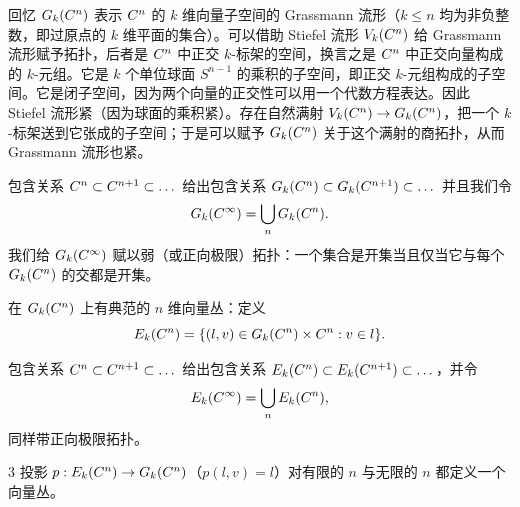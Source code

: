 回忆 $G_k(C^n)$ 表示 $C^n$ 的 $k$ 维向量子空间的 Grassmann 流形（$k\le n$ 均为非负整数，即过原点的 $k$ 维平面的集合）。可以借助 Stiefel 流形 $V_k(C^n)$ 给 Grassmann 流形赋予拓扑，后者是 $C^n$ 中正交 $k$-标架的空间，换言之是 $C^n$ 中正交向量构成的 $k$-元组。它是 $k$ 个单位球面 $S^{n-1}$ 的乘积的子空间，即正交 $k$-元组构成的子空间。它是闭子空间，因为两个向量的正交性可以用一个代数方程表达。因此 Stiefel 流形紧（因为球面的乘积紧）。存在自然满射 $V_k(C^n)\to G_k(C^n)$，把一个 $k$-标架送到它张成的子空间；于是可以赋予 $G_k(C^n)$ 关于这个满射的商拓扑，从而 Grassmann 流形也紧。


包含关系 $C^n\subset C^{n+1}\subset\dots$ 给出包含关系 $G_k(C^n)\subset G_k(C^{n+1})\subset\dots$
并且我们令
\[ G_k(C^\infty)=\bigcup_n G_k(C^n). \]
我们给 $G_k(C^\infty)$ 赋以弱（或正向极限）拓扑：一个集合是开集当且仅当它与每个 $G_k(C^n)$ 的交都是开集。

在 $G_k(C^n)$ 上有典范的 $n$ 维向量丛：定义
\[ E_k(C^n)=\{(l,v)\in G_k(C^n)\times C^n : v\in l\}. \]


包含关系 $C^n\subset C^{n+1}\subset\dots$ 给出包含关系 $E_k(C^n)\subset E_k(C^{n+1})\subset\dots$，并令
\[ E_k(C^\infty)=\bigcup_n E_k(C^n), \]
同样带正向极限拓扑。

\begin{lem}{3}
投影 $p: E_k(C^n)\to G_k(C^n)$（$p(l,v)=l$）对有限的 $n$ 与无限的 $n$ 都定义一个向量丛。
\end{lem}

